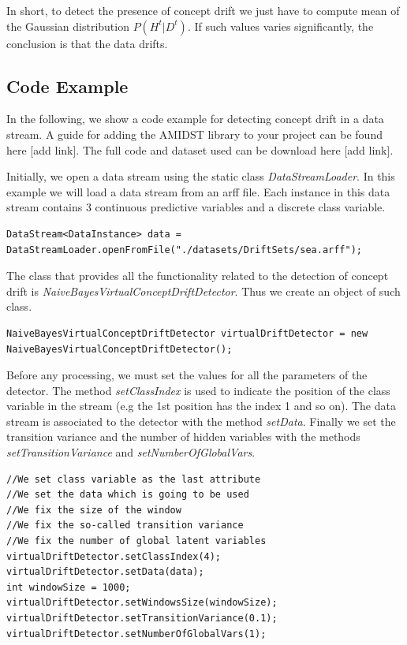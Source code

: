 \documentclass[10pt,a4paper]{article}
\begin{document}
In short, to detect the presence of concept drift we just have to compute mean of the Gaussian distribution $P(H^t \vert D^t)$. If such values varies significantly, the conclusion is that the data drifts.\newline 


\subsection{Code Example}\label{sec:blog_conceptdrift:what}

In the following, we show a code example for detecting concept drift in a data stream. A guide for adding the AMIDST library to your project can be found here [add link]. The full code and dataset used can be download here [add link].\newline 

Initially, we open a data stream using the static class \textit{DataStreamLoader}. In this example we will load a data stream from an arff file. Each instance in this data stream contains 3 continuous predictive variables and a discrete class variable.\newline 

\begin{verbatim}
DataStream<DataInstance> data = DataStreamLoader.openFromFile("./datasets/DriftSets/sea.arff");
\end{verbatim}

The class that provides all the functionality related to the detection of concept drift is \textit{NaiveBayesVirtualConceptDriftDetector}. Thus we create an object of such class.

\begin{verbatim}
NaiveBayesVirtualConceptDriftDetector virtualDriftDetector = new NaiveBayesVirtualConceptDriftDetector();
\end{verbatim}




Before any processing, we must set the values for all the parameters of the detector. The method \textit{setClassIndex} is used to indicate the position of the class variable in the stream (e.g the 1st position has the index 1 and so on). The data stream is associated to the detector with the method \textit{setData}. Finally we set the transition variance and the number of hidden variables with the methods \textit{setTransitionVariance} and \textit{setNumberOfGlobalVars}.

\begin{verbatim}
//We set class variable as the last attribute
//We set the data which is going to be used
//We fix the size of the window
//We fix the so-called transition variance
//We fix the number of global latent variables
virtualDriftDetector.setClassIndex(4);
virtualDriftDetector.setData(data);
int windowSize = 1000;
virtualDriftDetector.setWindowsSize(windowSize);
virtualDriftDetector.setTransitionVariance(0.1);
virtualDriftDetector.setNumberOfGlobalVars(1);
\end{verbatim}
\end{document}
